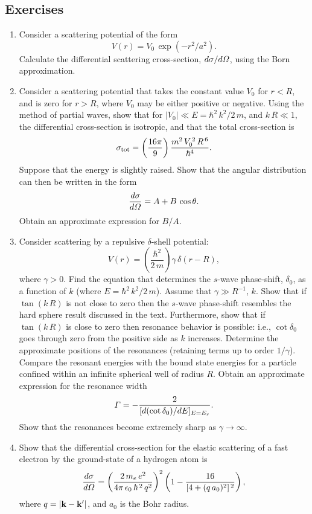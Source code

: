 \subsection*{Exercises}
\begin{enumerate}[label=\thechapter.\arabic*,leftmargin=*,widest=9.20]
\item Consider a scattering potential of the form
$$
V(r)=V_0\,\exp(-r^2/a^2).
$$
Calculate the differential scattering cross-section, $d\sigma/d{\mit\Omega}$, using the Born approximation.

\item Consider a scattering potential that takes the constant value $V_0$ for $r<R$, and is zero
for $r>R$, where $V_0$ may be either positive or negative. Using the method of partial waves, show
that for $|V_0|\ll E=\hbar^2\,k^2/2\,m$, and $k\,R\ll 1$, the differential cross-section is isotropic, and that
the total cross-section is
$$
\sigma_{\rm tot} = \left(\frac{16\pi}{9}\right) \frac{m^2\,V_0^{\,2}\,R^{\,6}}{\hbar^4}.
$$
Suppose that  the energy is slightly raised. Show that the angular distribution can then
be written in the form
$$
\frac{d\sigma}{d{\mit\Omega} }= A + B\,\cos\theta.
$$
Obtain an approximate expression for $B/A$. 

\item Consider scattering by a repulsive $\delta$-shell potential:
$$
V(r) = \left(\frac{\hbar^2}{2\,m}\right)\gamma\,\delta(r-R),
$$
where $\gamma>0$. 
Find the equation that determines the $s$-wave phase-shift, $\delta_0$, as a function of $k$ (where $E=\hbar^2\,k^2/2\,m$). 
Assume that  $\gamma\gg R^{-1}$, $k$. Show that if $\tan(k\,R)$ is not close to zero then the $s$-wave phase-shift
resembles the hard sphere result discussed in the text. Furthermore, show that if $\tan(k\,R)$ is close to zero then resonance
behavior is possible: i.e., $\cot \delta_0$ goes through zero from the positive side as $k$ increases. Determine the
approximate positions of the resonances (retaining terms up to order $1/\gamma$). Compare the resonant
energies with the bound state energies for a particle confined within an infinite spherical well of radius $R$. 
Obtain an approximate expression for the resonance width
$$
{\mit\Gamma} = - \frac{2}{[d(\cot\delta_0)/dE]_{E=E_r}}.
$$
Show that the resonances become extremely sharp as $\gamma\rightarrow \infty$. 

\item Show that the differential cross-section for the elastic scattering of a fast electron by the ground-state of a hydrogen
atom is 
$$
\frac{d\sigma}{d{\mit\Omega}} = \left(\frac{2\,m_e\,e^2}{4\pi\,\epsilon_0\,\hbar^{\,2}\,q^2}\right)^2\left(1-\frac{16}{[4+(q\,a_0)^2]^{\,2}}\right),
$$
where $q=|{\bf k}-{\bf k}'|$, and $a_0$ is the Bohr radius. 
\end{enumerate}


